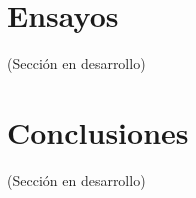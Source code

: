 \documentclass[10pt,a4paper]{article}
\begin{document}
\section{Ensayos}\label{ensayos}
(Sección en desarrollo)
\newpage

\section{Conclusiones}\label{conclusiones}
(Sección en desarrollo)
\printbibliography
\newpage
\glsaddall
\printnoidxglossary[type=\acronymtype,title={Abreviaturas}]
\end{document}
